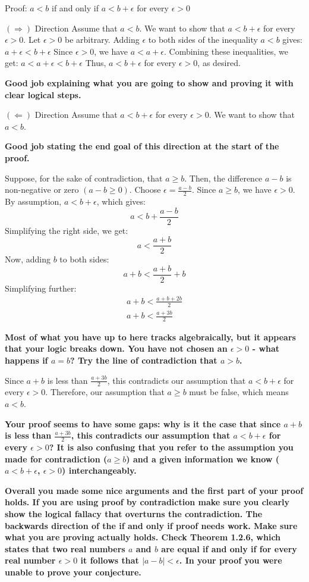 \documentclass{report}
\begin{document}
Proof: $a<b$ if and only if $a<b+\epsilon$ for every $\epsilon>0$
\par
$(\Rightarrow)$ Direction
Assume that $a<b$. We want to show that $a<b+\epsilon$ for every $\epsilon>0$.
Let $\epsilon>0$ be arbitrary. Adding $\epsilon$ to both sides of the inequality $a<b$ gives: $a+\epsilon<b+\epsilon$
Since $\epsilon>0$, we have $a<a+\epsilon$. Combining these inequalities, we get: $a<a+\epsilon<b+\epsilon$
Thus, $a<b+\epsilon$ for every $\epsilon>0$, as desired.

\textbf{Good job explaining what you are going to show and proving it with clear logical steps.}
\bigskip
\par
$(\Leftarrow)$ Direction
Assume that $a<b+\epsilon$ for every $\epsilon>0$. We want to show that $a<b$.

\textbf{Good job stating the end goal of this direction at the start of the proof.}

Suppose, for the sake of contradiction, that $a \geq b$. Then, the difference $a-b$ is non-negative or zero $(a-b \geq 0)$.
Choose $\epsilon=\frac{a-b}{2}$. Since $a \geq b$, we have $\epsilon>0$. By assumption, $a<b+\epsilon$, which gives:
$$
a<b+\frac{a-b}{2}
$$
Simplifying the right side, we get:
$$
a<\frac{a+b}{2}
$$
Now, adding $b$ to both sides:
$$
a+b<\frac{a+b}{2}+b
$$
Simplifying further:
$$
\begin{gathered}
a+b<\frac{a+b+2 b}{2} \\
a+b<\frac{a+3 b}{2}
\end{gathered}
$$

\textbf{Most of what you have up to here tracks algebraically, but it appears that your logic breaks down. You have not chosen an $\epsilon >0 $ - what happens if $a =b$? Try the line of contradiction that $a > b$.
}

Since $a+b$ is less than $\frac{a+3 b}{2}$, this contradicts our assumption that $a<b+\epsilon$ for every $\epsilon>0$. Therefore, our assumption that $a \geq b$ must be false, which means $a<b$.
\par
\textbf{Your proof seems to have some gaps: why is it the case that since $a+b$ is less than $\frac{a+3 b}{2}$, this contradicts our assumption that $a<b+\epsilon$ for every $\epsilon>0$?
It is also confusing that you refer to the assumption you made for contradiction ($a \geq b $) and a given information we know ($ a < b + \epsilon$, $\epsilon > 0$) interchangeably.}
\par\textbf{
Overall you made some nice arguments and the first part of your proof holds. If you are using proof by contradiction make sure you clearly show the logical fallacy that overturns the contradiction. The backwards direction of the if and only if proof needs work. Make sure what you are proving actually holds. Check Theorem 1.2.6, which states that two real numbers $a$ and $b$ are equal if and only if for every real number $\epsilon >0 $ it follows that $|a-b|< \epsilon$. In your proof you were unable to prove your conjecture.}
\end{document}
